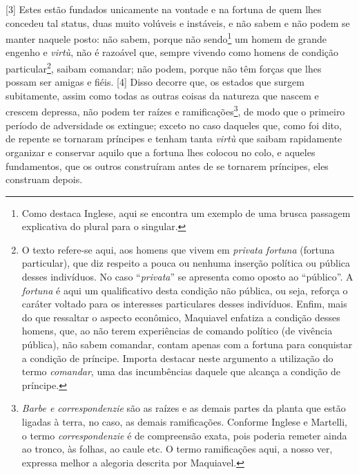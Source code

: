 {[}3{]} Estes estão fundados unicamente na vontade e na fortuna de quem
lhes concedeu tal status, duas muito volúveis e instáveis, e não sabem e
não podem se manter naquele posto: não sabem, porque não sendo\footnote{Como
  destaca Inglese, aqui se encontra um exemplo de uma brusca passagem
  explicativa do plural para o singular.} um homem de grande engenho e
\emph{virtù}, não é razoável que, sempre vivendo como homens de condição
particular\footnote{O texto refere-se aqui, aos homens que vivem em
  \emph{privata fortuna} (fortuna particular), que diz respeito a pouca
  ou nenhuma inserção política ou pública desses indivíduos. No caso
  ``\emph{privata}'' se apresenta como oposto ao ``público''. A
  \emph{fortuna} é aqui um qualificativo desta condição não pública, ou
  seja, reforça o caráter voltado para os interesses particulares desses
  indivíduos. Enfim, mais do que ressaltar o aspecto econômico,
  Maquiavel enfatiza a condição desses homens, que, ao não terem
  experiências de comando político (de vivência pública), não sabem
  comandar, contam apenas com a fortuna para conquistar a condição de
  príncipe. Importa destacar neste argumento a utilização do termo
  \emph{comandar}, uma das incumbências daquele que alcança a condição
  de príncipe.}, saibam comandar; não podem, porque não têm forças que
lhes possam ser amigas e fiéis. {[}4{]} Disso decorre que, os estados
que surgem subitamente, assim como todas as outras coisas da natureza
que nascem e crescem depressa, não podem ter raízes e
ramificações\footnote{\emph{Barbe e correspondenzie} são as raízes e as
  demais partes da planta que estão ligadas à terra, no caso, as demais
  ramificações. Conforme Inglese e Martelli, o termo
  \emph{correspondenzie} é de compreensão exata, pois poderia remeter
  ainda ao tronco, às folhas, ao caule etc. O termo ramificações aqui, a
  nosso ver, expressa melhor a alegoria descrita por Maquiavel.}, de
modo que o primeiro período de adversidade os extingue; exceto no caso
daqueles que, como foi dito, de repente se tornaram príncipes e tenham
tanta \emph{virtù} que saibam rapidamente organizar e conservar aquilo
que a fortuna lhes colocou no colo, e aqueles fundamentos, que os outros
construíram antes de se tornarem príncipes, eles construam depois.

